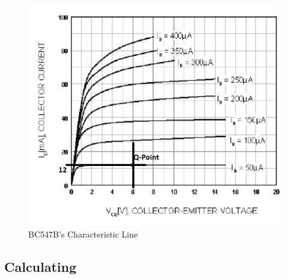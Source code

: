 \documentclass[twoside, a4paper, leqno]{article}
\begin{document}
		\begin{center}
			\begin{figure}[htp]
				\begin{center}
					\includegraphics[scale = .8]{figure/Q_point_BC547B.png}
				\end{center}
				\caption{BC547B's Characteristic Line}
				\label{refFigure2}
			\end{figure}
		\end{center}
	
		\subsection*{Calculating}
		
\end{document}
